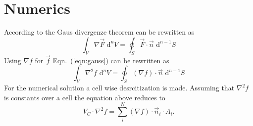 \chapter{Numerics}
According to \cite{erlebacher1985finite} the Gaus divergenze theorem can be rewritten as
\begin{equation}
  \label{eqn:gauss}
  \int_V \nabla \vec{F} \,\, \mathrm{d}^n V = \oint_S \vec{F} \cdot \vec{n} \,\, \mathrm{d}^{n-1}S
\end{equation}
Using $\nabla f$ for $\vec{f}$ Eqn.~(\ref{eqn:gauss}) can be rewritten as
\begin{equation}
  \int_V \nabla^2 f \,\, \mathrm{d}^n V = \oint_S (\nabla f) \cdot \vec{n} \,\, \mathrm{d}^{n-1}S
\end{equation}
For the numerical solution a cell wise desrcitization is made.
Assuming that $\nabla^2 f$ is constants over a cell the equation above reduces to
\begin{equation}
  V_C \cdot \nabla^2 f = \sum_i^N (\nabla f) \cdot \vec{n}_i \cdot A_{i}.
\end{equation}

